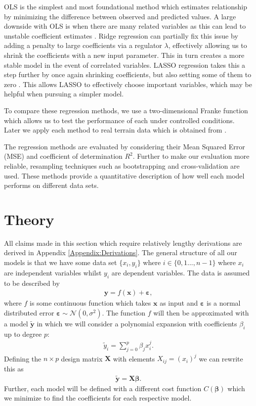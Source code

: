 \documentclass[%
reprint,
amsmath,amssymb,
aps,
pra,
]{revtex4-2}
\begin{document}
OLS is the simplest and most foundational method which estimates relationship by minimizing the difference between observed and predicted values. A large downside with OLS is when there are many related variables as this can lead to unstable coefficient estimates \cite{Bishop2006}. Ridge regression can partially fix this issue by adding a penalty to large coefficients via a regulator $\lambda$, effectively allowing us to shrink the coefficients with a new input parameter. This in turn creates a more stable model in the event of correlated variables. LASSO regression takes this a step further by once again shrinking coefficients, but also setting some of them to zero \cite{hastie01statisticallearning}. This allows LASSO to effectively choose important variables, which may be helpful when pursuing a simpler model.

To compare these regression methods, we use a two-dimensional Franke function which allows us to test the performance of each under controlled conditions. Later we apply each method to real terrain data which is obtained from \cite{USGS_EarthExplorer}.

The regression methods are evaluated by considering their Mean Squared Error (MSE) and coefficient of determination $R^2$. Further to make our evaluation more reliable, resampling techniques such as bootstrapping and cross-validation are used. These methods provide a quantitative description of how well each model performs on different data sets.
\section{Theory}
All claims made in this section which require relatively lengthy derivations are derived in Appendix \ref{Appendix:Derivations}. The general structure of all our models is that we have some data set $\{x_i,y_i\}$ where $i\in\{0,1...,n-1\}$ where $x_i$ are independent variables whilst $y_i$ are dependent variables. The data is assumed to be described by
\begin{align}
	\bm y=f(\bm x)+\bm \varepsilon,
	\label{eq:data}
\end{align}
where $f$ is some continuous function which takes $\bm x$ as input and $\bm\varepsilon$ is a normal distributed error $\bm\varepsilon\sim\mathcal{N}(0,\sigma^2)$. The function $f$ will then be approximated with a model $\tilde{\bm y}$ in which we will consider a polynomial expansion with coefficients $\beta_i$ up to degree $p$:
\begin{align}
	\tilde{y}_i=\sum_{j=0}^{p}\beta_j x_i^j.
	\label{eq:model}
\end{align}
Defining the $n\times p$ design matrix $\bm X$ with elements $X_{ij}=(x_i)^j$ we can rewrite this as
\begin{align}
	\tilde{\bm y}=\bm X\bm\beta.
\end{align}
Further, each model will be defined with a different cost function $C(\bm\beta)$ which we minimize to find the coefficients for each respective model.
\end{document}
